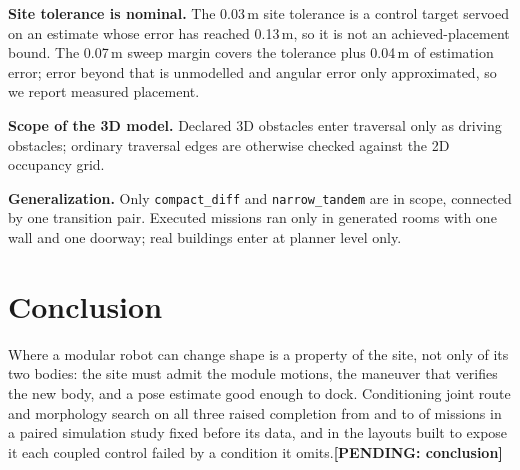 \documentclass[conference]{IEEEtran}
\newcommand{\pending}[1]{\textbf{[PENDING: #1]}}
\newcommand{\method}[1]{\texttt{#1}}
\newcommand{\withresults}[2]{\ifdefined\resTrials #1\else #2\fi}
\begin{document}
\textbf{Site tolerance is nominal.} The 0.03\,m site tolerance is a control target servoed on an estimate whose error has reached 0.13\,m, so it is not an achieved-placement bound. The 0.07\,m sweep margin covers the tolerance plus 0.04\,m of estimation error; error beyond that is unmodelled and angular error only approximated, so we report measured placement.

\textbf{Scope of the 3D model.} Declared 3D obstacles enter traversal only as driving obstacles; ordinary traversal edges are otherwise checked against the 2D occupancy grid.

\textbf{Generalization.} Only \method{compact\_diff} and \method{narrow\_tandem} are in scope, connected by one transition pair. Executed missions ran only in generated rooms with one wall and one doorway; real buildings enter at planner level only.

\section{Conclusion}
\withresults{Where a modular robot can change shape is a property of the site, not only of its two bodies: the site must admit the module motions, the maneuver that verifies the new body, and a pose estimate good enough to dock. Conditioning joint route and morphology search on all three raised completion from \resCompletedGeometry{} and \resCompletedFeasibility{} to \resCompletedSensing{} of \resTrialsSensing{} missions in a paired simulation study fixed before its data, and in the layouts built to expose it each coupled control failed by a condition it omits.}{\pending{conclusion}}
\end{document}
